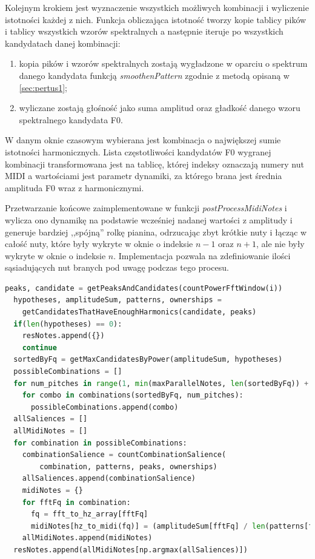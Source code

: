 \documentclass[12pt,a4paper,twoside]{mwart}
\begin{document}
Kolejnym krokiem jest wyznaczenie wszystkich możliwych kombinacji i wyliczenie istotności każdej z nich. Funkcja obliczająca istotność tworzy kopie tablicy pików i tablicy wszystkich wzorów spektralnych a następnie iteruje po wszystkich kandydatach danej kombinacji:
\begin{enumerate}
  \item kopia pików i wzorów spektralnych zostają wygładzone w oparciu o spektrum danego kandydata funkcją \textit{smoothenPattern} zgodnie z metodą opisaną w \ref{sec:pertus1};
  \item wyliczane zostają głośność jako suma amplitud oraz gładkość danego wzoru spektralnego kandydata F0.
\end{enumerate}
W danym oknie czasowym wybierana jest kombinacja o największej sumie istotności harmonicznych. Lista częstotliwości kandydatów F0 wygranej kombinacji transformowana jest na tablicę, której indeksy oznaczają numery nut MIDI a wartościami jest parametr dynamiki, za którego brana jest średnia amplituda F0 wraz z harmonicznymi.

Przetwarzanie końcowe zaimplementowane w funkcji \textit{postProcessMidiNotes} i wylicza ono dynamikę na podstawie wcześniej nadanej wartości z amplitudy i generuje bardziej ,,spójną'' rolkę pianina, odrzucając zbyt krótkie nuty i łącząc w całość nuty, które były wykryte w oknie o indeksie $n-1$ oraz $n+1$, ale nie były wykryte w oknie o indeksie $n$. Implementacja pozwala na zdefiniowanie ilości sąsiadujących nut branych pod uwagę podczas tego procesu.

\begin{lstlisting}[language=Python, caption={Trzon algorytmu Pertusa i Iñesta (2008)}, captionpos=b, label={code:coreMethodPetrusa1}, numbers=none]
  peaks, candidate = getPeaksAndCandidates(countPowerFftWindow(i))
  hypotheses, amplitudeSum, patterns, ownerships =
    getCandidatesThatHaveEnoughHarmonics(candidate, peaks)
  if(len(hypotheses) == 0):
    resNotes.append({})
    continue
  sortedByFq = getMaxCandidatesByPower(amplitudeSum, hypotheses)
  possibleCombinations = []
  for num_pitches in range(1, min(maxParallelNotes, len(sortedByFq)) + 1):
    for combo in combinations(sortedByFq, num_pitches):
      possibleCombinations.append(combo)
  allSaliences = []
  allMidiNotes = []
  for combination in possibleCombinations:
    combinationSalience = countCombinationSalience(
        combination, patterns, peaks, ownerships)
    allSaliences.append(combinationSalience)
    midiNotes = {}
    for fftFq in combination:
      fq = fft_to_hz_array[fftFq]
      midiNotes[hz_to_midi(fq)] = (amplitudeSum[fftFq] / len(patterns[fftFq]))
    allMidiNotes.append(midiNotes)
  resNotes.append(allMidiNotes[np.argmax(allSaliences)])
\end{lstlisting}
\end{document}

